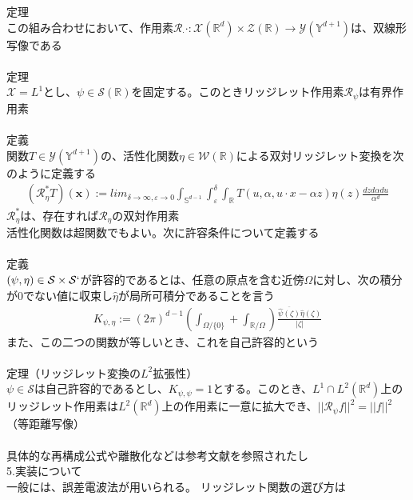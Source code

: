\documentclass{jsarticle}
\begin{document}
定理\\
この組み合わせにおいて、作用素$\mathcal{R}_\cdot \cdot:\mathcal{X}(\mathbb{R}^d)\times\mathcal{Z}(\mathbb{R})\rightarrow\mathcal{Y}(\mathbb{Y}^{d+1})$は、双線形写像である\\
　\\
定理\\
$\mathcal{X}=L^1$とし、$\psi\in\mathcal{S}(\mathbb{R})$を固定する。このときリッジレット作用素$\mathcal{R}_\psi$は有界作用素\\
　\\
定義\\
関数$T\in\mathcal{Y}(\mathbb{Y}^{d+1})$の、活性化関数$\eta\in\mathcal{W}(\mathbb{R})$による双対リッジレット変換を次のように定義する
\begin{eqnarray}
(\mathcal{R}^*_\eta T)(\bm{x}):=lim_{\delta\rightarrow\infty,\varepsilon\rightarrow0}\int_{\mathbb{S}^{d-1}}\int^\delta_\varepsilon\int_{\mathbb{R}}T(u,\alpha,u\cdot x-\alpha z)\eta(z)\frac{dzd\alpha du}{\alpha^d}
\end{eqnarray}
$\mathcal{R}^*_\eta $は、存在すれば$\mathcal{R}_\eta$の双対作用素
　\\
活性化関数は超関数でもよい。次に許容条件について定義する\\
　\\
定義\\
$(\psi,\eta)\in\mathcal{S}\times \mathcal{S}`$が許容的であるとは、任意の原点を含む近傍$\Omega$に対し、次の積分が0でない値に収束し$\hat{\eta}$が局所可積分であることを言う
\begin{eqnarray}
K_{\psi,\eta}:=(2\pi)^{d-1}(\int_{\Omega/\{0\}}+\int_{\mathbb{R}/\Omega})\frac{\overline{\hat{\psi}(\zeta)}\hat{\eta}(\zeta)}{|\zeta|}
\end{eqnarray}
また、この二つの関数が等しいとき、これを自己許容的という\\
　\\
定理（リッジレット変換の$L^2$拡張性）\\
$\psi\in\mathcal{S}$は自己許容的であるとし、$K_{\psi,\psi}=1$とする。このとき、$L^1\cap L^2(\mathbb{R}^d)$上のリッジレット作用素は$L^2(\mathbb{R}^d)$上の作用素に一意に拡大でき、$||\mathcal{R}_\psi f||^2=||f||^2$（等距離写像）\\
　\\
具体的な再構成公式や離散化などは参考文献を参照されたし
　\\
5.実装について\\
一般には、誤差電波法が用いられる。
リッジレット関数の選び方は
　\\
\end{document}

